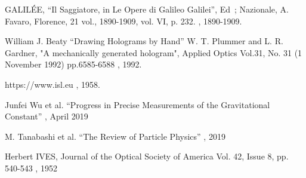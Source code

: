 \documentclass[a4paper,12pt]{article}
\begin{document}
\begin{appendix}
\begin{thebibliography}{1}
 GALILÉE, ``Il Saggiatore, in Le Opere di Galileo Galilei'', Ed ; Nazionale, A. Favaro, Florence, 21 vol., 1890-1909, vol. VI, p. 232.
, 1890-1909.

 William J. Beaty ``Drawing Holograms by Hand'' W. T. Plummer and L. R. Gardner, "A mechanically generated hologram", Applied Optics Vol.31, No. 31 (1 November 1992) pp.6585-6588
, 1992.

  https://www.isl.eu
, 1958.

  Junfei Wu et al. ``Progress in Precise Measurements of the Gravitational Constant''
, April 2019

 M. Tanabashi et al. ``The Review of Particle Physics''
, 2019

 Herbert IVES, Journal of the Optical Society of America Vol. 42, Issue 8, pp. 540-543 
, 1952

\end{thebibliography}
\end{appendix}
\end{document}
